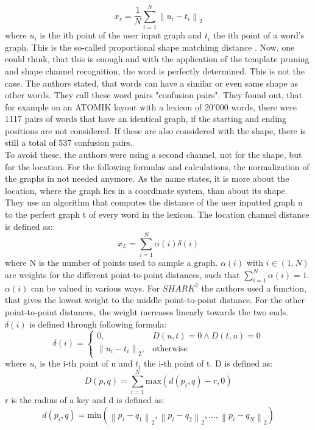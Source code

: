 \begin{equation}
    x_s = \frac{1}{N}\sum_{i = 1}^{N}\left\lVert u_i - t_i\right\rVert_2
\end{equation}
where $u_i$ is the ith point of the user input graph and $t_i$ the ith point of a word's graph. This is the so-called proportional shape matchimg distance \cite{Kristensson2004SHARK2AL}. Now, one could think, that this is enough and with the application of the template pruning and shape channel recognition, the word is perfectly determined. This is not the case. The authors stated, that words can have a similar or even same shape as other words. They call these word pairs "confusion pairs". They found out, that for example on an ATOMIK layout with a lexicon of 20'000 words, there were 1117 pairs of words that have an identical graph, if the starting and ending positions are not considered. If these are also considered with the shape, there is still a total of 537 confusion pairs.\\
To avoid these, the authors were using a second channel, not for the shape, but for the location. For the following formulas and calculations, the normalization of the graphs in not needed anymore. As the name states, it is more about the location, where the graph lies in a coordinate system, than about its shape.\\
They use an algorithm that computes the distance of the user inputted graph u to the perfect graph t of every word in the lexicon. The location channel distance is defined as:
\begin{equation}
    x_L = \sum_{i = 1}^{N}\alpha(i)\delta(i)
    \label{eqn:locationformula}
\end{equation}
where N is the number of points used to sample a graph. $\alpha(i)$ with $i \in (1,N)$ are weights for the different point-to-point distances, such that $\sum_{i = 1}^{N}\alpha(i) = 1$. $\alpha(i)$ can be valued in various ways. For $SHARK^2$ the authors used a function, that gives the lowest weight to the middle point-to-point distance. For the other point-to-point distances, the weight increases linearly towards the two ends. $\delta(i)$ is defined through following formula:
\begin{equation}
    \delta(i) =
        \begin{cases}
            0, & D(u,t) = 0 \land D(t,u) = 0 \\
            \left\lVert u_i - t_i \right\rVert_2, & \text{otherwise}
        \end{cases}
\end{equation}
where $u_i$ is the i-th point of u and $t_i$ the i-th point of t. D is defined as:
\begin{equation}
    D(p,q) = \sum_{i = 1}^{N}\text{max}(d(p_i,q) - r,0)
\end{equation}
r is the radius of a key and d is defined as:
\begin{equation}
    d(p_i,q) = \text{min}(\left\lVert p_i - q_1 \right\rVert_2, \left\lVert p_i - q_2 \right\rVert_2, \dots, \left\lVert p_i - q_N\right\rVert_2)
\end{equation}


